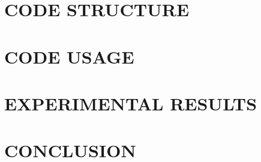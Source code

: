 \documentclass[letterpaper, 10 pt, conference]{ieeeconf}  %
\begin{document}
\section{CODE STRUCTURE}

\section{CODE USAGE}

\section{EXPERIMENTAL RESULTS}

\section{CONCLUSION}









\begin{thebibliography}{99}

\end{thebibliography}
\end{document}
